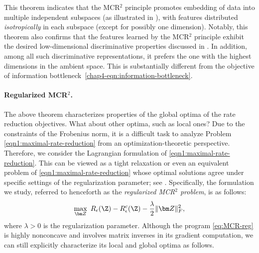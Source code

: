 \documentclass[../../book-main.tex]{subfiles}
\begin{document}
This theorem indicates that the MCR$^2$ principle promotes embedding of data into multiple independent subspaces (as illustrated in ), with features distributed {\em isotropically} in each subspace (except for possibly one dimension). Notably, this theorem also confirms that the features learned by the MCR$^2$ principle exhibit the desired low-dimensional discriminative properties discussed in . In addition, among all such discriminative representations, it prefers the one with the highest dimensions in the ambient space. This is substantially different from the objective of information bottleneck~\eqref{chap4-eqn:information-bottleneck}.







\paragraph{Regularized MCR$^2$.}
The above theorem characterizes properties of the global optima of the rate reduction objectives. What about other optima, such as local ones?  Due to the constraints of the Frobenius norm, it is a difficult task to analyze Problem \eqref{eqn1:maximal-rate-reduction} from an optimization-theoretic perspective. Therefore, we consider the Lagrangian formulation of \eqref{eqn1:maximal-rate-reduction}. This can be viewed as a tight relaxation or even an equivalent problem of \eqref{eqn1:maximal-rate-reduction} whose optimal solutions agree under specific settings of the regularization parameter; see \cite[Proposition 1]{wang2024global}.
Specifically, the formulation we study, referred to henceforth as the \textit{regularized MCR$^2$ problem}, is as follows:
\begin{align}\label{eq:MCR-reg}
	\max_{\bm Z}\ R_{\epsilon}(\Z) - R_{\epsilon}^c(\Z) - \frac{\lambda}{2}\|\bm Z\|_F^2,
\end{align}
where $\lambda > 0$ is the regularization parameter. Although the program  \eqref{eq:MCR-reg} is highly nonconcave and involves matrix inverses in its gradient computation, we can still explicitly characterize its local and global optima as follows.
\end{document}
